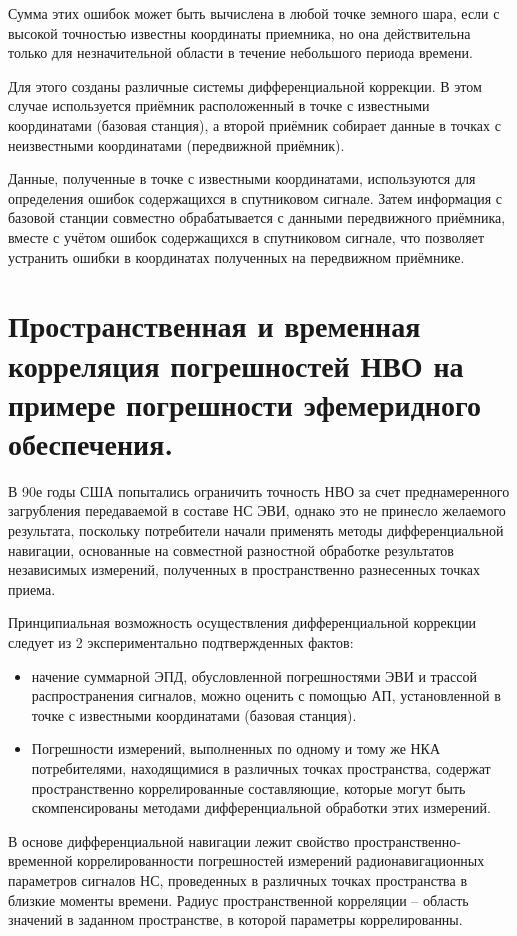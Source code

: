 \documentclass[14pt,a4paper,oneside]{extarticle}
\begin{document}
Сумма этих ошибок может быть вычислена в любой точке земного шара, если с высокой точностью известны координаты приемника, но она действительна только для незначительной области в течение небольшого периода времени.

Для этого созданы различные системы дифференциальной коррекции. В этом случае используется приёмник расположенный в точке с известными координатами (базовая станция), а второй приёмник собирает данные в точках с неизвестными координатами (передвижной приёмник).

Данные, полученные в точке с известными координатами, используются для определения ошибок содержащихся в спутниковом сигнале. Затем информация с базовой станции совместно обрабатывается с данными передвижного приёмника, вместе с учётом ошибок содержащихся в спутниковом сигнале, что позволяет устранить ошибки в координатах полученных на передвижном приёмнике.

\section{Пространственная и временная корреляция погрешностей НВО на примере погрешности эфемеридного обеспечения.}

В 90е годы США попытались ограничить точность НВО за счет преднамеренного загрубления передаваемой в составе НС ЭВИ, однако это не принесло желаемого результата, поскольку потребители начали применять методы дифференциальной навигации, основанные на совместной разностной обработке результатов независимых измерений, полученных в пространственно разнесенных точках приема.

Принципиальная возможность осуществления дифференциальной коррекции следует из 2 экспериментально подтвержденных фактов:

\begin{itemize}
    \item начение суммарной ЭПД, обусловленной погрешностями ЭВИ и трассой распространения сигналов, можно оценить с помощью АП, установленной в точке с известными координатами (базовая станция).
    \item Погрешности измерений, выполненных по одному и тому же НКА потребителями, находящимися в различных точках пространства, содержат пространственно коррелированные составляющие, которые могут быть скомпенсированы методами дифференциальной обработки этих измерений.
\end{itemize}

В основе дифференциальной навигации лежит свойство пространственно-временной коррелированности погрешностей измерений радионавигационных параметров сигналов НС, проведенных в различных точках пространства в близкие моменты времени.
Радиус пространственной корреляции – область значений в заданном пространстве, в которой параметры коррелированны.
\end{document}
